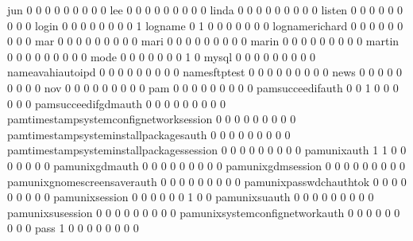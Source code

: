 \documentclass[compress,8pt]{beamer}
\begin{document}
\begin{frame}
\begin{Schunk}
  jun                                        0   0   0   0   0   0   0   0   0
  lee                                        0   0   0   0   0   0   0   0   0
  linda                                      0   0   0   0   0   0   0   0   0
  listen                                     0   0   0   0   0   0   0   0   0
  login                                      0   0   0   0   0   0   0   0   1
  logname                                    0   1   0   0   0   0   0   0   0
  lognamerichard                             0   0   0   0   0   0   0   0   0
  mar                                        0   0   0   0   0   0   0   0   0
  mari                                       0   0   0   0   0   0   0   0   0
  marin                                      0   0   0   0   0   0   0   0   0
  martin                                     0   0   0   0   0   0   0   0   0
  mode                                       0   0   0   0   0   0   0   1   0
  mysql                                      0   0   0   0   0   0   0   0   0
  nameavahiautoipd                           0   0   0   0   0   0   0   0   0
  namesftptest                               0   0   0   0   0   0   0   0   0
  news                                       0   0   0   0   0   0   0   0   0
  nov                                        0   0   0   0   0   0   0   0   0
  pam                                        0   0   0   0   0   0   0   0   0
  pamsucceedifauth                           0   0   1   0   0   0   0   0   0
  pamsucceedifgdmauth                        0   0   0   0   0   0   0   0   0
  pamtimestampsystemconfignetworksession     0   0   0   0   0   0   0   0   0
  pamtimestampsysteminstallpackagesauth      0   0   0   0   0   0   0   0   0
  pamtimestampsysteminstallpackagessession   0   0   0   0   0   0   0   0   0
  pamunixauth                                1   1   0   0   0   0   0   0   0
  pamunixgdmauth                             0   0   0   0   0   0   0   0   0
  pamunixgdmsession                          0   0   0   0   0   0   0   0   0
  pamunixgnomescreensaverauth                0   0   0   0   0   0   0   0   0
  pamunixpasswdchauthtok                     0   0   0   0   0   0   0   0   0
  pamunixsession                             0   0   0   0   0   0   1   0   0
  pamunixsuauth                              0   0   0   0   0   0   0   0   0
  pamunixsusession                           0   0   0   0   0   0   0   0   0
  pamunixsystemconfignetworkauth             0   0   0   0   0   0   0   0   0
  pass                                       1   0   0   0   0   0   0   0   0

\end{Schunk}
\end{frame}
\end{document}
